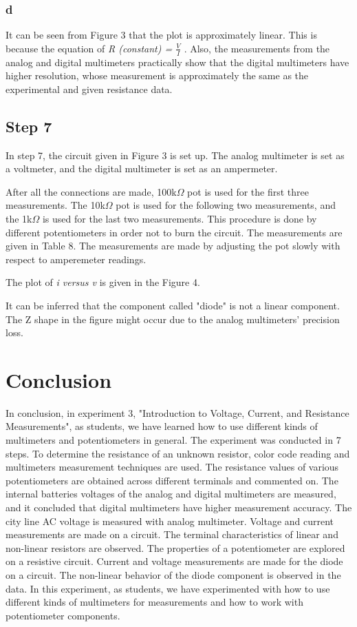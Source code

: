 \documentclass[letterpaper,12pt]{article}
\begin{document}
\subsubsection{d}
It can be seen from Figure 3 that the plot is approximately linear. This is because the equation of  \emph{ R (constant) = \(\frac{V}{I}\) } . Also, the measurements from the analog and digital multimeters practically show that the digital multimeters have higher resolution, whose measurement is approximately the same as the experimental and given resistance data.
\subsection{Step 7}
In step 7, the circuit given in Figure 3 is set up. The analog multimeter is set as a voltmeter, and the digital multimeter is set as an ampermeter.  


After all the connections are made, 100k\(\Omega\) pot is used for the first three measurements. The 10k\(\Omega\) pot is used for the following two measurements, and the 1k\(\Omega\) is used for the last two measurements. This procedure is done by different potentiometers in order not to burn the circuit. The measurements are given in Table 8. The measurements are made by adjusting the pot slowly with respect to amperemeter readings.

The plot of \emph{i versus v} is given in the Figure 4.

It can be inferred that the component called "diode" is not a linear component. The Z shape in the figure might occur due to the analog multimeters' precision loss. 

\section{Conclusion}
In conclusion, in experiment 3, "Introduction to Voltage, Current, and Resistance Measurements", as students, we have learned how to use different kinds of multimeters and potentiometers in general. The experiment was conducted in 7 steps. To determine the resistance of an unknown resistor, color code reading and multimeters measurement techniques are used. The resistance values of various potentiometers are obtained across different terminals and commented on. The internal batteries voltages of the analog and digital multimeters are measured, and it concluded that digital multimeters have higher measurement accuracy. The city line AC voltage is measured with analog multimeter. Voltage and current measurements are made on a circuit. The terminal characteristics of linear and non-linear resistors are observed. The properties of a potentiometer are explored on a resistive circuit. Current and voltage measurements are made for the diode on a circuit. The non-linear behavior of the diode component is observed in the data.  In this experiment, as students, we have experimented with how to use different kinds of multimeters for measurements and how to work with potentiometer components.
\end{document}
